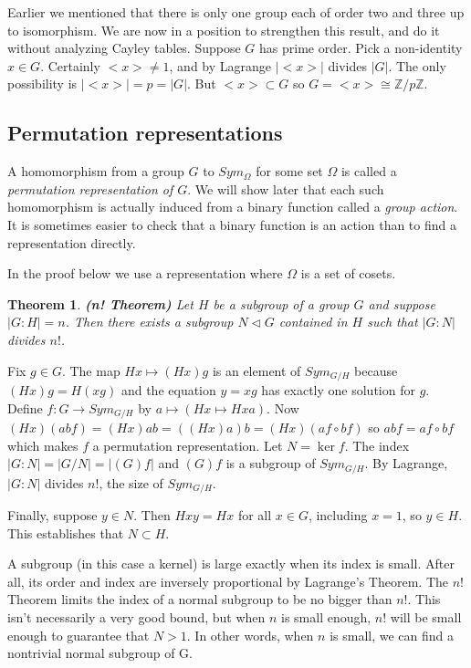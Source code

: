\documentclass[letterpaper]{article}
\newtheorem{theorem}{Theorem}[section]
\newenvironment{proof}[1][Proof]{\begin{trivlist}
\item[\hskip \labelsep {\bfseries #1}]}{\end{trivlist}}
\begin{document}
Earlier we mentioned that there is only one group each of order two
and three up to isomorphism. We are now in a position to strengthen
this result, and do it without analyzing Cayley tables. Suppose $G$
has prime order. Pick a non-identity $x \in G$. Certainly ${<}x{>}
\ne 1$, and by Lagrange $|{<}x{>}|$ divides $|G|$. The only possibility
is $|{<}x{>}| = p = |G|$. But ${<}x{>} \subset G$ so $G = {<}x{>}
\cong \mathbb{Z}/p\mathbb{Z}$.

\subsection{Permutation representations}

A homomorphism from a group $G$ to $Sym_\Omega$ for some set $\Omega$
is called a \emph{permutation representation of $G$}. We will show
later that each such homomorphism is actually induced from a binary
function called a \emph{group action}. It is sometimes easier to
check that a binary function is an action than to find a representation
directly.

In the proof below we use a representation where $\Omega$ is a set
of cosets.

\begin{theorem}
\emph{\textbf{(n! Theorem)}}
Let $H$ be a subgroup of a group $G$ and suppose $|G\colon H| = n$.
Then there exists a subgroup $N \lhd G$ contained in $H$ such that
$|G \colon N|$ divides $n!$.
\end{theorem}
\begin{proof}
Fix $g \in G$. The map $Hx \mapsto (Hx)g$ is an element of $Sym_{G/H}$
because $(Hx)g = H(xg)$ and the equation $y = xg$ has exactly one
solution for $g$. Define $f\colon G \rightarrow Sym_{G/H}$ by $a
\mapsto (Hx \mapsto Hxa)$. Now $(Hx)(abf) = (Hx)ab = ((Hx)a)b =
(Hx)(af \circ bf)$ so $abf = af \circ bf$ which makes $f$ a permutation
representation. Let $N = \ker{f}$. The index $|G \colon N| = |G/N|
= |(G)f|$ and $(G)f$ is a subgroup of $Sym_{G/H}$. By Lagrange, $|G
\colon N|$ divides $n!$, the size of $Sym_{G/H}$.

Finally, suppose $y \in N$. Then $Hxy = Hx$ for all $x \in G$,
including $x = 1$, so $y \in H$. This establishes that $N \subset
H$.
\end{proof}

A subgroup (in this case a kernel) is large exactly when its index
is small. After all, its order and index are inversely proportional
by Lagrange's Theorem. The $n!$ Theorem limits the index of a normal
subgroup to be no bigger than $n!$. This isn't necessarily a very
good bound, but when $n$ is small enough, $n!$ will be small enough
to guarantee that $N > 1$. In other words, when $n$ is small, we
can find a nontrivial normal subgroup of G.
\end{document}
